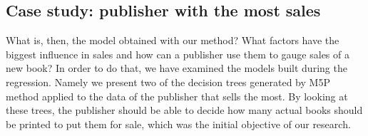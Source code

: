 \documentclass[a4paper,10pt,twocolumn,preprint,3p]{elsarticle}
\begin{document}
\begin{table*}[!ht]
\caption{Predicting Total sales for publishing company UDLU11 (ReliefFAttributeEval-FS). Best values in bold.}
\centering{}%
\label{Table:case4results-RAE}
\end{table*}



\subsection{Case study: publisher with the most sales}
\label{subsec:decision_trees}

What is, then, the model obtained with our method? What factors have
the biggest influence in sales and how can a publisher use them to gauge
sales of a new book? In order to do that, we have examined the models
built during the regression. Namely we present two of the decision
trees generated by M5P method applied to the data of the publisher
that sells the most. By looking at these trees, the publisher should
be able to decide how many actual books should be printed to put them
for sale, which was the initial objective of our research.
\end{document}
